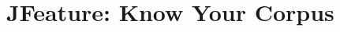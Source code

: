 \chapter[JFeature: Know Your Corpus]{\texorpdfstring{%
JFeature: Know Your Corpus}{%
JFeature: Know Your Corpus}}

\paperRemark{\paperIref}


% 



% 




% 


